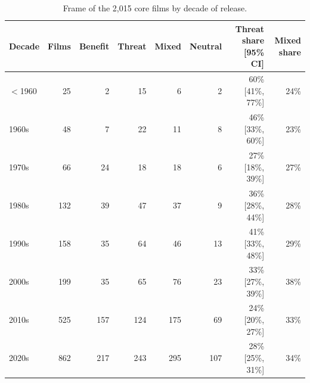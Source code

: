 \begin{table}[htbp]
\centering
\caption{Frame of the 2,015 core films by decade of release.}
\label{tab:frame_by_decade}
\begin{tabular}{lrrrrrrr}
\toprule
Decade & Films & Benefit & Threat & Mixed & Neutral & Threat share [95\% CI] & Mixed share \\
\midrule
$<$1960 & 25 & 2 & 15 & 6 & 2 & 60\% [41\%, 77\%] & 24\% \\
1960s & 48 & 7 & 22 & 11 & 8 & 46\% [33\%, 60\%] & 23\% \\
1970s & 66 & 24 & 18 & 18 & 6 & 27\% [18\%, 39\%] & 27\% \\
1980s & 132 & 39 & 47 & 37 & 9 & 36\% [28\%, 44\%] & 28\% \\
1990s & 158 & 35 & 64 & 46 & 13 & 41\% [33\%, 48\%] & 29\% \\
2000s & 199 & 35 & 65 & 76 & 23 & 33\% [27\%, 39\%] & 38\% \\
2010s & 525 & 157 & 124 & 175 & 69 & 24\% [20\%, 27\%] & 33\% \\
2020s & 862 & 217 & 243 & 295 & 107 & 28\% [25\%, 31\%] & 34\% \\
\bottomrule
\end{tabular}
\end{table}
